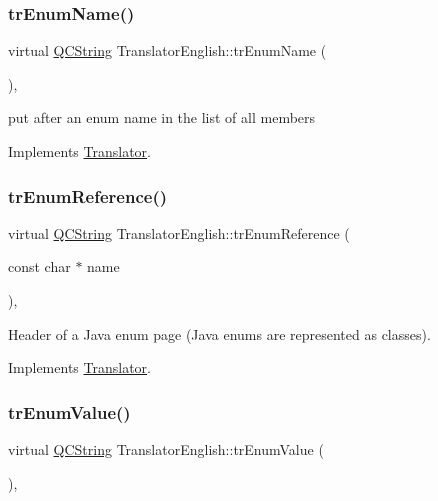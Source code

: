 \subsubsection{\texorpdfstring{trEnumName()}{trEnumName()}}
{\footnotesize\ttfamily virtual \mbox{\hyperlink{class_q_c_string}{Q\+C\+String}} Translator\+English\+::tr\+Enum\+Name (\begin{DoxyParamCaption}{ }\end{DoxyParamCaption})\hspace{0.3cm}{\ttfamily [inline]}, {\ttfamily [virtual]}}

put after an enum name in the list of all members 

Implements \mbox{\hyperlink{class_translator}{Translator}}.

\mbox{\label{class_translator_english_a6d27a926603cd4031b3c2050e12c9cc1}} 
\subsubsection{\texorpdfstring{trEnumReference()}{trEnumReference()}}
{\footnotesize\ttfamily virtual \mbox{\hyperlink{class_q_c_string}{Q\+C\+String}} Translator\+English\+::tr\+Enum\+Reference (\begin{DoxyParamCaption}\item[{const char $\ast$}]{name }\end{DoxyParamCaption})\hspace{0.3cm}{\ttfamily [inline]}, {\ttfamily [virtual]}}

Header of a Java enum page (Java enums are represented as classes). 

Implements \mbox{\hyperlink{class_translator}{Translator}}.

\mbox{\label{class_translator_english_ab050b806454d027c1ed85e3fa9ebc28e}} 
\subsubsection{\texorpdfstring{trEnumValue()}{trEnumValue()}}
{\footnotesize\ttfamily virtual \mbox{\hyperlink{class_q_c_string}{Q\+C\+String}} Translator\+English\+::tr\+Enum\+Value (\begin{DoxyParamCaption}{ }\end{DoxyParamCaption})\hspace{0.3cm}{\ttfamily [inline]}, {\ttfamily [virtual]}}

